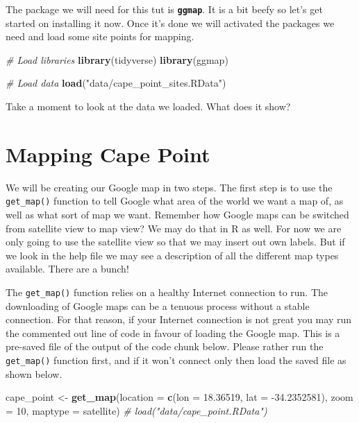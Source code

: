 \documentclass[
]{book}
\newenvironment{Shaded}{\begin{snugshade}}{\end{snugshade}}
\newcommand{\CommentTok}[1]{\textcolor[rgb]{0.56,0.35,0.01}{\textit{#1}}}
\newcommand{\DataTypeTok}[1]{\textcolor[rgb]{0.13,0.29,0.53}{#1}}
\newcommand{\DecValTok}[1]{\textcolor[rgb]{0.00,0.00,0.81}{#1}}
\newcommand{\FloatTok}[1]{\textcolor[rgb]{0.00,0.00,0.81}{#1}}
\newcommand{\KeywordTok}[1]{\textcolor[rgb]{0.13,0.29,0.53}{\textbf{#1}}}
\newcommand{\NormalTok}[1]{#1}
\newcommand{\StringTok}[1]{\textcolor[rgb]{0.31,0.60,0.02}{#1}}
\begin{document}
The package we will need for this tut is \textbf{\texttt{ggmap}}. It is a bit beefy so let's get started on installing it now. Once it's done we will activated the packages we need and load some site points for mapping.

\begin{Shaded}
\begin{Highlighting}[]
\CommentTok{\# Load libraries}
\KeywordTok{library}\NormalTok{(tidyverse)}
\KeywordTok{library}\NormalTok{(ggmap)}

\CommentTok{\# Load data}
\KeywordTok{load}\NormalTok{(}\StringTok{"data/cape\_point\_sites.RData"}\NormalTok{)}
\end{Highlighting}
\end{Shaded}

Take a moment to look at the data we loaded. What does it show?

\hypertarget{mapping-cape-point}{%
\section{Mapping Cape Point}\label{mapping-cape-point}}

We will be creating our Google map in two steps. The first step is to use the \texttt{get\_map()} function to tell Google what area of the world we want a map of, as well as what sort of map we want. Remember how Google maps can be switched from satellite view to map view? We may do that in R as well. For now we are only going to use the satellite view so that we may insert out own labels. But if we look in the help file we may see a description of all the different map types available. There are a bunch!

The \texttt{get\_map()} function relies on a healthy Internet connection to run. The downloading of Google maps can be a tenuous process without a stable connection. For that reason, if your Internet connection is not great you may run the commented out line of code in favour of loading the Google map. This is a pre-saved file of the output of the code chunk below. Please rather run the \texttt{get\_map()} function first, and if it won't connect only then load the saved file as shown below.

\begin{Shaded}
\begin{Highlighting}[]
\NormalTok{cape\_point <{-}}\StringTok{ }\KeywordTok{get\_map}\NormalTok{(}\DataTypeTok{location =} \KeywordTok{c}\NormalTok{(}\DataTypeTok{lon =} \FloatTok{18.36519}\NormalTok{, }\DataTypeTok{lat =} \FloatTok{{-}34.2352581}\NormalTok{),}
                        \DataTypeTok{zoom =} \DecValTok{10}\NormalTok{, }\DataTypeTok{maptype =} \StringTok{\textquotesingle{}satellite\textquotesingle{}}\NormalTok{)}
\CommentTok{\# load("data/cape\_point.RData")}
\end{Highlighting}
\end{Shaded}
\end{document}
